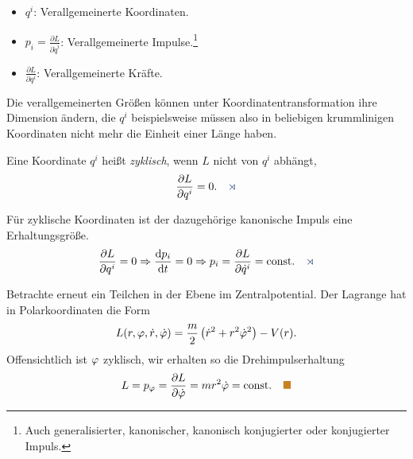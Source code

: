 \begin{bemn}
\begin{itemize}[label=]
  \item $q^i$: Verallgemeinerte Koordinaten.
  \item $p_i = \frac{\partial L}{\partial \dot{q}^i}$: Verallgemeinerte
  Impulse.\footnote{Auch generalisierter, kanonischer, kanonisch
  konjugierter oder konjugierter Impuls.}
  \item $\frac{\partial L}{\partial q^i}$: Verallgemeinerte Kräfte.
\end{itemize}
Die verallgemeinerten Größen können unter Koordinatentransformation ihre
Dimension ändern, die $q^i$ beispielsweise müssen also in beliebigen
krummlinigen Koordinaten nicht mehr die Einheit einer Länge haben.\maphere
\end{bemn}

\begin{defnn}
Eine Koordinate $q^i$ heißt \emph{zyklisch}, wenn $L$ nicht von $q^i$ abhängt,
\begin{align*}
\frac{\partial L}{\partial q^i} = 0.\fishhere
\end{align*}
\end{defnn}

\begin{propn}
Für zyklische Koordinaten ist der dazugehörige kanonische Impuls
 eine Erhaltungsgröße.
\begin{align*}
\frac{\partial L}{\partial q^i} = 0 \Rightarrow \frac{\diffd p_i}{\dt} =
0 \Rightarrow p_i=\frac{\partial L}{\partial \dot{q}^i} = \const.\fishhere
\end{align*}
\end{propn}

\begin{bsp}
Betrachte erneut ein Teilchen in der Ebene im Zentralpotential. Der Lagrange
hat in Polarkoordinaten die Form
\begin{align*}
L(r,\varphi,\dot{r},\dot{\varphi}) = \frac{m}{2}\left(\dot{r}^2 + r^2\dot{\varphi}^2
\right)-V(r).
\end{align*}
Offensichtlich ist $\varphi$ zyklisch, wir erhalten so die Drehimpulserhaltung
\begin{align*}
L = p_\ph = \frac{\partial L}{\partial\dot{\ph}} = mr^2\dot{\ph} =
\const.\bsphere
\end{align*}
\end{bsp}

